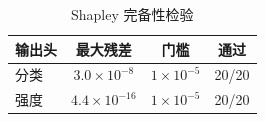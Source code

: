 \begin{table}[htbp]
  \centering
\caption{Shapley 完备性检验}
  \label{tab:p3-completeness}
  \begin{tabularx}{\textwidth}{@{}Xccc@{}}
    \toprule
    输出头 & 最大残差 & 门槛 & 通过 \\
    \midrule
    分类 & $3.0\times10^{-8}$ & $1{\times}10^{-5}$ & 20/20 \\
    强度 & $4.4\times10^{-16}$ & $1{\times}10^{-5}$ & 20/20 \\
    \bottomrule
  \end{tabularx}
\end{table}